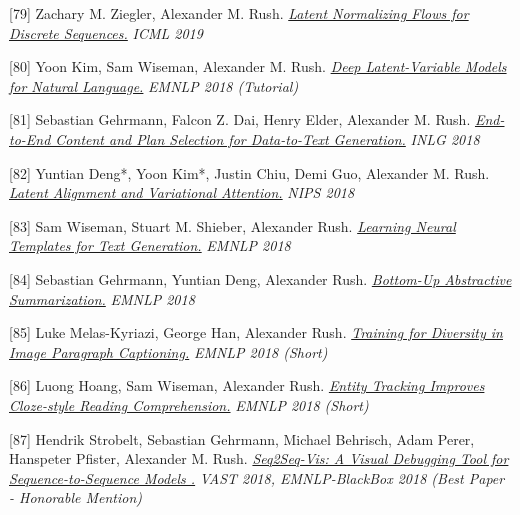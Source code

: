\documentclass[10pt]{article}
\begin{document}
\medskip


[79] \ind Zachary M. Ziegler, Alexander M. Rush. \emph{\href{ https://arxiv.org/pdf/1901.10548 }{ Latent Normalizing Flows for Discrete Sequences.} }\emph{ ICML 2019 }

\medskip


[80] \ind Yoon Kim, Sam Wiseman, Alexander M. Rush. \emph{\href{ https://github.com/harvardnlp/DeepLatentNLP/raw/master/tutorial_deep_latent.pdf }{ Deep Latent-Variable Models for Natural Language.} }\emph{ EMNLP 2018 (Tutorial) }

\medskip


[81] \ind Sebastian Gehrmann, Falcon Z. Dai, Henry Elder, Alexander M. Rush. \emph{\href{ https://arxiv.org/pdf/1810.04700 }{ End-to-End Content and Plan Selection for Data-to-Text Generation.} }\emph{ INLG 2018 }

\medskip


[82] \ind Yuntian Deng*, Yoon Kim*, Justin Chiu, Demi Guo, Alexander M. Rush. \emph{\href{ https://arxiv.org/pdf/1807.03756.pdf }{ Latent Alignment and Variational Attention.} }\emph{ NIPS 2018 }

\medskip


[83] \ind Sam Wiseman, Stuart M. Shieber, Alexander Rush. \emph{\href{ https://arxiv.org/abs/1808.10122 }{ Learning Neural Templates for Text Generation.} }\emph{ EMNLP 2018 }

\medskip


[84] \ind Sebastian Gehrmann, Yuntian Deng, Alexander Rush. \emph{\href{ https://arxiv.org/abs/1808.10792 }{ Bottom-Up Abstractive Summarization.} }\emph{ EMNLP 2018 }

\medskip


[85] \ind Luke Melas-Kyriazi, George Han, Alexander Rush. \emph{\href{ https://www.aclweb.org/anthology/D18-1084 }{ Training for Diversity in Image Paragraph Captioning.} }\emph{ EMNLP 2018 (Short) }

\medskip


[86] \ind Luong Hoang, Sam Wiseman, Alexander Rush. \emph{\href{ https://www.aclweb.org/anthology/D18-1130 }{ Entity Tracking Improves Cloze-style Reading Comprehension.} }\emph{ EMNLP 2018 (Short) }

\medskip


[87] \ind Hendrik Strobelt, Sebastian Gehrmann, Michael Behrisch, Adam Perer, Hanspeter Pfister, Alexander M. Rush. \emph{\href{ https://arxiv.org/abs/1804.09299 }{ Seq2Seq-Vis: A Visual Debugging Tool for Sequence-to-Sequence Models .} }\emph{ VAST 2018, EMNLP-BlackBox 2018 (Best Paper - Honorable Mention) }
\end{document}
